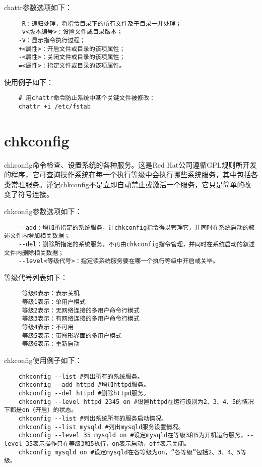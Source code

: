 \documentclass[a4paper,left=2.5cm,right=2.5cm,11pt]{article}
\begin{document}
	chattr参数选项如下：
	\begin{lstlisting}
	-R：递归处理，将指令目录下的所有文件及子目录一并处理； 
	-v<版本编号>：设置文件或目录版本； 
	-V：显示指令执行过程； 
	+<属性>：开启文件或目录的该项属性； 
	-<属性>：关闭文件或目录的该项属性； 
	=<属性>：指定文件或目录的该项属性。
	\end{lstlisting}

	使用例子如下：
	\begin{lstlisting}
	# 用chattr命令防止系统中某个关键文件被修改：
	chattr +i /etc/fstab
	\end{lstlisting}

\section{chkconfig}
	chkconfig命令检查、设置系统的各种服务。这是Red Hat公司遵循GPL规则所开发的程序，它可查询操作系统在每一个执行等级中会执行哪些系统服务，其中包括各类常驻服务。谨记chkconfig不是立即自动禁止或激活一个服务，它只是简单的改变了符号连接。\par

	chkconfig参数选项如下：
	\begin{lstlisting}
	--add：增加所指定的系统服务，让chkconfig指令得以管理它，并同时在系统启动的叙述文件内增加相关数据； 
	--del：删除所指定的系统服务，不再由chkconfig指令管理，并同时在系统启动的叙述文件内删除相关数据； 
	--level<等级代号>：指定读系统服务要在哪一个执行等级中开启或关毕。
	\end{lstlisting}

	等级代号列表如下：
	\begin{lstlisting}
	 等级0表示：表示关机 
	 等级1表示：单用户模式 
	 等级2表示：无网络连接的多用户命令行模式 
	 等级3表示：有网络连接的多用户命令行模式 
	 等级4表示：不可用 
	 等级5表示：带图形界面的多用户模式 
	 等级6表示：重新启动
	\end{lstlisting}

	chkconfig使用例子如下：
	\begin{lstlisting}
	chkconfig --list #列出所有的系统服务。 
	chkconfig --add httpd #增加httpd服务。 
	chkconfig --del httpd #删除httpd服务。 
	chkconfig --level httpd 2345 on #设置httpd在运行级别为2、3、4、5的情况下都是on（开启）的状态。 
	chkconfig --list #列出系统所有的服务启动情况。 
	chkconfig --list mysqld #列出mysqld服务设置情况。 
	chkconfig --level 35 mysqld on #设定mysqld在等级3和5为开机运行服务，--level 35表示操作只在等级3和5执行，on表示启动，off表示关闭。 
	chkconfig mysqld on #设定mysqld在各等级为on，“各等级”包括2、3、4、5等级。
	\end{lstlisting}
\end{document}
